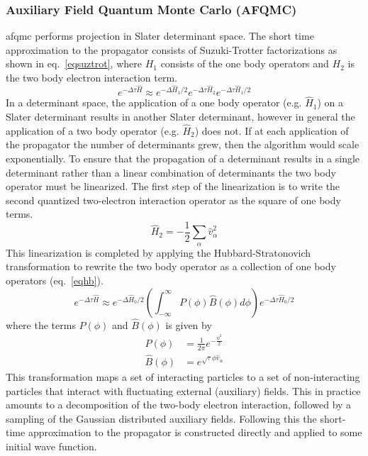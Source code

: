 \subsubsection{Auxiliary Field Quantum Monte Carlo (AFQMC)}
\gls{afqmc} performs projection in Slater determinant space.
The short time approximation to the propagator consists of Suzuki-Trotter factorizations as shown in eq.~\ref{eqsuztrot}, where $H_1$ consists of the one body operators and $H_2$ is the two body electron interaction term.
\begin{equation}
e^{-\Delta\tau\hat{H}} \approx e^{-\Delta\hat{H}_1/2} e^{-\Delta\tau\hat{H}_2} e^{-\Delta\tau\hat{H}_1/2}
\label{eqsuztrot}
\end{equation}
In a determinant space, the application of a one body operator (e.g. $\hat{H}_1$) on a Slater determinant results in another Slater determinant, however in general the application of a two body operator (e.g. $\hat{H}_2$) does not.
If at each application of the propagator the number of determinants grew, then the algorithm would scale exponentially. 
To ensure that the propagation of a determinant results in a single determinant rather than a linear combination of determinants the two body operator must be linearized.
The first step of the linearization is to write the second quantized two-electron interaction operator as the square of one body terms.
\begin{equation}
    \hat{H}_2 = -\frac{1}{2} \sum_{\alpha} \hat{v}^2_{\alpha}
    \label{eqdecomp}
\end{equation}
This linearization is completed by applying the Hubbard-Stratonovich transformation to rewrite the two body operator as a collection of one body operators (eq.~\ref{eqhb}).\cite{10.1103/PhysRevLett.3.77,zotero-4182}
\begin{equation}
e^{-\Delta\tau\hat{H}} \approx e^{-\Delta\hat{H}_0/2} \left( \int_{-\infty}^{\infty} P(\phi) \hat{B}(\phi) d\phi \right) e^{-\Delta\tau\hat{H}_0/2}
\label{eqhb}
\end{equation}
where the terms $P(\phi)$ and $\hat{B}(\phi)$ is given by
\begin{align}
    P(\phi) &= \frac{1}{2\pi} e^{-\frac{\phi^2}{2}} \\
    \hat{B}(\phi) &= e^{\sqrt{\tau} \phi \hat{v}_{\alpha}}
    \label{eqhb2}
\end{align}
This transformation maps a set of interacting particles to a set of non-interacting particles that interact with fluctuating external (auxiliary) fields.
This in practice amounts to a decomposition of the two-body electron interaction, followed by a sampling of the Gaussian distributed auxiliary fields.
Following this the short-time approximation to the propagator is constructed directly and applied to some initial wave function.

